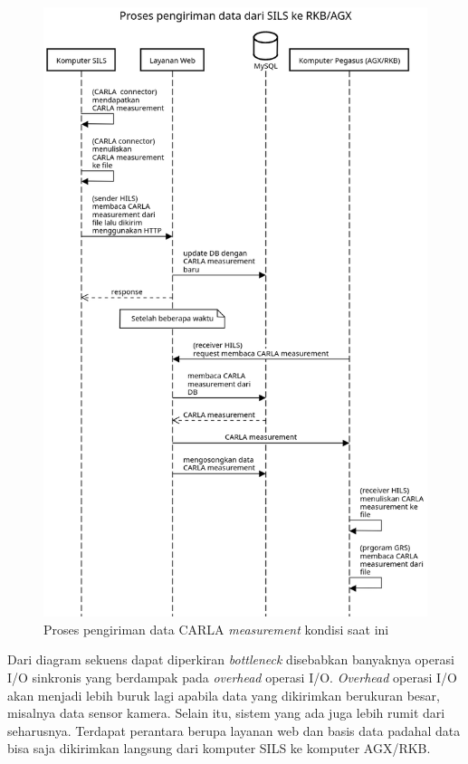 \begin{figure}[h!]
	\centering
	\includegraphics[width=1.0\textwidth]{resources/chapter-3/sequence-diagram-old-hils-process.png}
	\caption{Proses pengiriman data CARLA \textit{measurement} kondisi saat ini}
	\label{chapter-3-sequence-diagram-old-hils}
\end{figure}

Dari diagram sekuens dapat diperkiran \textit{bottleneck} disebabkan
banyaknya operasi I/O sinkronis yang berdampak pada \textit{overhead} operasi
I/O. \textit{Overhead} operasi I/O akan menjadi lebih buruk lagi apabila data
yang dikirimkan berukuran besar, misalnya data sensor kamera. Selain itu, sistem
yang ada juga lebih rumit dari seharusnya. Terdapat perantara berupa layanan web
dan basis data padahal data bisa saja dikirimkan langsung dari komputer SILS ke
komputer AGX/RKB.

